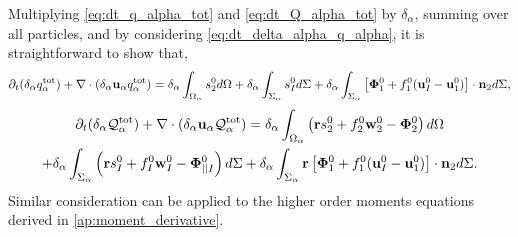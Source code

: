 Multiplying \ref{eq:dt_q_alpha_tot} and \ref{eq:dt_Q_alpha_tot} by $\delta_\alpha$, summing over all particles, and by considering \ref{eq:dt_delta_alpha_q_alpha}, it is straightforward to show that,
\begin{equation}
    \partial_t (\delta_\alpha  q_\alpha^\text{tot})
    + \mathbf{\nabla}\cdot (\delta_\alpha\textbf{u}_\alpha q_\alpha^\text{tot})
    = \delta_\alpha\int_{\Omega_\alpha} s_2^0 d\Omega
    + \delta_\alpha\int_{\Sigma_\alpha} s_I^0 d\Sigma
    + \delta_\alpha\int_{\Sigma_\alpha} \left[\mathbf{\Phi}_1^0 + f_1^0 (\textbf{u}_I^0-\textbf{u}_1^0) \right] \cdot \textbf{n}_2 d\Sigma,
    \label{eq:dt_dq_alpha_tot}
\end{equation}
\begin{multline}
    \partial_t (\delta_\alpha  \mathcal{Q}_\alpha^\text{tot})
    + \mathbf{\nabla}\cdot (\delta_\alpha\textbf{u}_\alpha \mathcal{Q}_\alpha^\text{tot})
    = \delta_\alpha\int_{\Omega_\alpha} \left(
        \textbf{r} s_2^0         
        + f_2^0  \textbf{w}_2^0 
        - \mathbf{\Phi}_2^0
    \right) d\Omega\\
    + \delta_\alpha\int_{\Sigma_\alpha} \left(
        \textbf{r}s_I^0
        + f_I^0 \textbf{w}_I^0
        - \mathbf{\Phi}_{||I}^0
    \right) d\Sigma
    + \delta_\alpha\int_{\Sigma_\alpha} \textbf{r} \left[
        \mathbf{\Phi}_1^0
        + f_1^0 (\textbf{u}_I^0-\textbf{u}_1^0)
    \right]\cdot \textbf{n}_2  d\Sigma.
    \label{eq:dt_dQ_alpha_tot}
\end{multline}
Similar consideration can be applied to the higher order moments equations derived in \ref{ap:moment_derivative}.


